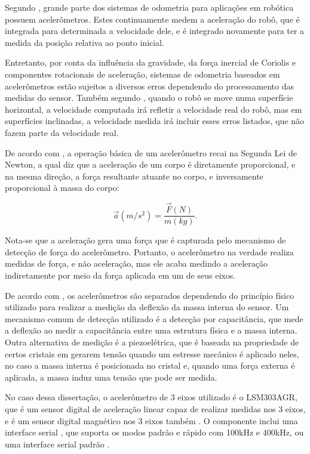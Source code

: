 \documentclass[acronym, symbols, table, deposito]{fei}
\begin{document}
				Segundo \textcite{NISTLER2011413}, grande parte dos sistemas de odometria para aplicações em robótica possuem acelerômetros. Estes continuamente medem a aceleração do robô, que é integrada para determinada a velocidade dele, e é integrado novamente para ter a medida da posição relativa ao ponto inicial.
				
				Entretanto, por conta da influência da gravidade, da força inercial de Coriolis \cite{persson1998we} e componentes rotacionais de aceleração, sistemas de odometria baseados em acelerômetros estão sujeitos a diversos erros dependendo do processamento das medidas do sensor. Também segundo \textcite{NISTLER2011413}, quando o robô se move numa superfície horizontal, a velocidade computada irá refletir a velocidade real do robô, mas em superfícies inclinadas, a velocidade medida irá incluir esses erros listados, que não fazem parte da velocidade real.
			
				De acordo com \textcite{dadafshar2014accelerometer}, a operação básica de um acelerômetro recai na Segunda Lei de Newton, a qual diz que a aceleração de um corpo é diretamente proporcional, e na mesma direção, a força resultante atuante no corpo, e inversamente proporcional à massa do corpo:
				
				\begin{equation}\label{eq:newton_second_law}
					\overrightarrow{a}(m/s^2) = \frac{\overrightarrow{F}(N)}{m(kg)}.
				\end{equation}
			
				Nota-se que a aceleração gera uma força que é capturada pelo mecanismo de detecção de força do acelerômetro. Portanto, o acelerômetro na verdade realiza medidas de força, e não aceleração, mas ele acaba medindo a aceleração indiretamente por meio da força aplicada em um de seus eixos.
				
				De acordo com \textcite{siegwart2011introduction}, os acelerômetros são separados dependendo do princípio físico utilizado para realizar a medição da deflexão da massa interna do sensor. Um mecanismo comum de detecção utilizado é a detecção por capacitância, que mede a deflexão ao medir a capacitância entre uma estrutura física e a massa interna. Outra alternativa de medição é a piezoelétrica, que é baseada na propriedade de certos cristais em gerarem tensão quando um estresse mecânico é aplicado neles, no caso a massa interna é posicionada no cristal e, quando uma força externa é aplicada, a massa induz uma tensão que pode ser medida.
				
				No caso dessa dissertação, o acelerômetro de 3 eixos utilizado é o LSM303AGR, que é um sensor digital de aceleração linear capaz de realizar medidas nos 3 eixos, e é um sensor digital magnético nos 3 eixos também \cite{datasheet_accel}. O componente inclui uma interface serial , que suporta os modos padrão e rápido com 100kHz e 400kHz, ou uma interface serial padrão .
				
\end{document}
